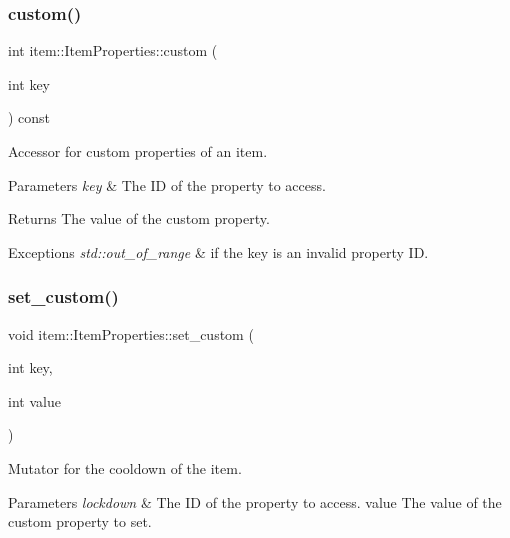 \subsubsection{\texorpdfstring{custom()}{custom()}}
{\footnotesize\ttfamily int item\+::\+Item\+Properties\+::custom (\begin{DoxyParamCaption}\item[{int}]{key }\end{DoxyParamCaption}) const\hspace{0.3cm}{\ttfamily [inline]}}



Accessor for custom properties of an item. 


\begin{DoxyParams}{Parameters}
{\em key} & The ID of the property to access. \\
\hline
\end{DoxyParams}
\begin{DoxyReturn}{Returns}
The value of the custom property. 
\end{DoxyReturn}

\begin{DoxyExceptions}{Exceptions}
{\em std\+::out\+\_\+of\+\_\+range} & if the key is an invalid property ID. \\
\hline
\end{DoxyExceptions}
\mbox{\label{classitem_1_1_item_properties_a984264931e08aef21d41335afc3ba582}} 
\subsubsection{\texorpdfstring{set\+\_\+custom()}{set\_custom()}}
{\footnotesize\ttfamily void item\+::\+Item\+Properties\+::set\+\_\+custom (\begin{DoxyParamCaption}\item[{int}]{key,  }\item[{int}]{value }\end{DoxyParamCaption})\hspace{0.3cm}{\ttfamily [inline]}}



Mutator for the cooldown of the item. 


\begin{DoxyParams}{Parameters}
{\em lockdown} & The ID of the property to access.  value The value of the custom property to set. \\
\hline
\end{DoxyParams}
\mbox{\label{classitem_1_1_item_properties_a0192995b931d99be5e8e5a1c5d24311d}} 
